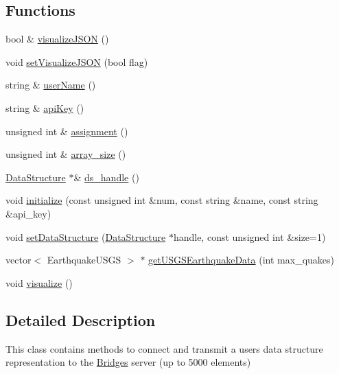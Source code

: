\subsection*{Functions}
\begin{DoxyCompactItemize}
\item 
bool \& \hyperlink{namespacebridges_1_1_bridges_a692124feb006d58c277db36c2e9342c8}{visualize\+J\+S\+O\+N} ()
\item 
void \hyperlink{namespacebridges_1_1_bridges_a322d97571beb1aa2b7d5e335990d9fa4}{set\+Visualize\+J\+S\+O\+N} (bool flag)
\item 
string \& \hyperlink{namespacebridges_1_1_bridges_a98c0c6658b8eb9e8f20a7f3119cbd984}{user\+Name} ()
\item 
string \& \hyperlink{namespacebridges_1_1_bridges_a4ec319d8c731624bd1aa0efa2427044e}{api\+Key} ()
\item 
unsigned int \& \hyperlink{namespacebridges_1_1_bridges_a97d6cfdc40ecead5d802ac2054933038}{assignment} ()
\item 
unsigned int \& \hyperlink{namespacebridges_1_1_bridges_ae3a860599a21cd9bfe0935106ae90a71}{array\+\_\+size} ()
\item 
\hyperlink{classbridges_1_1_data_structure}{Data\+Structure} $\ast$\& \hyperlink{namespacebridges_1_1_bridges_a611a331ed42dfdf89a724e435fbe37af}{ds\+\_\+handle} ()
\item 
void \hyperlink{namespacebridges_1_1_bridges_aff8e9d79f9e75cf20b51607ec385f189}{initialize} (const unsigned int \&num, const string \&name, const string \&api\+\_\+key)
\item 
void \hyperlink{namespacebridges_1_1_bridges_a4335a2dcc29c9288cf6482182d8f9bf6}{set\+Data\+Structure} (\hyperlink{classbridges_1_1_data_structure}{Data\+Structure} $\ast$handle, const unsigned int \&size=1)
\item 
vector$<$ Earthquake\+U\+S\+G\+S $>$ $\ast$ \hyperlink{namespacebridges_1_1_bridges_a0c4fb401192a6fa3048cf78e783958e8}{get\+U\+S\+G\+S\+Earthquake\+Data} (int max\+\_\+quakes)
\item 
void \hyperlink{namespacebridges_1_1_bridges_a2806e395134614cdd6327400b53d28ad}{visualize} ()
\end{DoxyCompactItemize}


\subsection{Detailed Description}
This class contains methods to connect and transmit a user\textquotesingle{}s data structure representation to the \hyperlink{namespacebridges_1_1_bridges}{Bridges} server (up to 5000 elements) 

